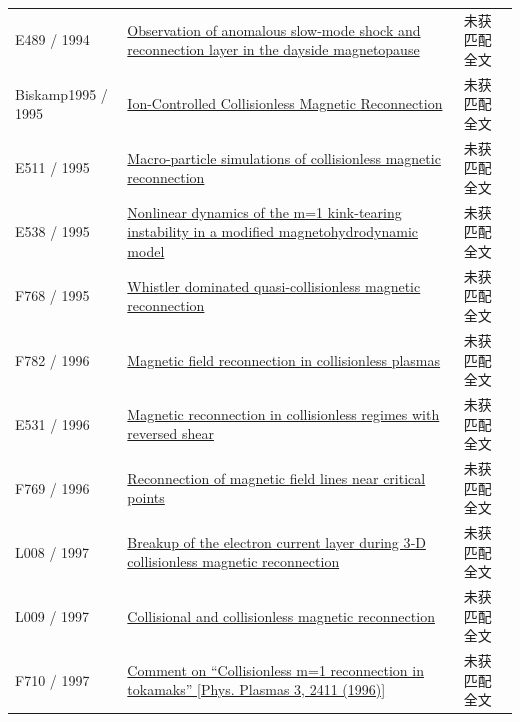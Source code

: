 \begin{longtable}{P{24mm}P{97mm}P{27mm}}
E489 / 1994 & \href{https://doi.org/10.1029/94ja01767}{Observation of anomalous slow‐mode shock and reconnection layer in the dayside magnetopause} & 未获匹配全文\\

Biskamp1995 / 1995 & \href{https://doi.org/10.1103/physrevlett.75.3850}{Ion-Controlled Collisionless Magnetic Reconnection} & 未获匹配全文\\

E511 / 1995 & \href{https://doi.org/10.1063/1.871192}{Macro-particle simulations of collisionless magnetic reconnection} & 未获匹配全文\\

E538 / 1995 & \href{https://doi.org/10.1063/1.871088}{Nonlinear dynamics of the m=1 kink-tearing instability in a modified magnetohydrodynamic model} & 未获匹配全文\\

F768 / 1995 & \href{http://hdl.handle.net/10068/262417}{Whistler dominated quasi-collisionless magnetic reconnection} & 未获匹配全文\\

F782 / 1996 & \href{http://www.osti.gov/scitech/biblio/489441-magnetic-field-reconnection-collisionless-plasmas}{Magnetic field reconnection in collisionless plasmas} & 未获匹配全文\\

E531 / 1996 & \href{http://www.osti.gov/scitech/biblio/489565-magnetic-reconnection-collisionless-regimes-reversed-shear}{Magnetic reconnection in collisionless regimes with reversed shear} & 未获匹配全文\\

F769 / 1996 & \href{http://hdl.handle.net/11568/54239}{Reconnection of magnetic field lines near critical points} & 未获匹配全文\\

L008 / 1997 & \href{https://doi.org/10.1029/97gl52961}{Breakup of the electron current layer during 3‐D collisionless magnetic reconnection} & 未获匹配全文\\

L009 / 1997 & \href{https://doi.org/10.1063/1.872338}{Collisional and collisionless magnetic reconnection} & 未获匹配全文\\

F710 / 1997 & \href{https://doi.org/10.1063/1.872215}{Comment on “Collisionless m=1 reconnection in tokamaks” [Phys. Plasmas 3,  2411 (1996)]} & 未获匹配全文\\


\end{longtable}
